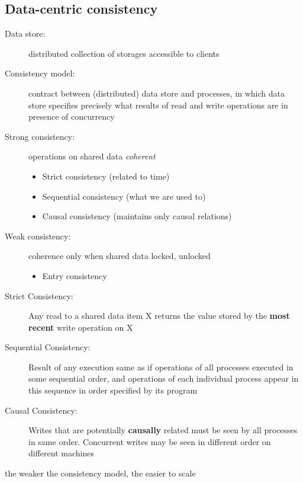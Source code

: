 \subsection{Data-centric consistency}
\begin{description}
	\item[Data store:] distributed collection of storages accessible to clients
	\item[Consistency model:] contract between (distributed) data store and processes, in which data store specifies precisely what results of read and write operations are in presence of concurrency
	\item[Strong consistency:] operations on shared data \textit{coherent}
		\begin{itemize}
			\item Strict consistency (related to time)
			\item Sequential consistency (what we are used to)
			\item Causal consistency (maintains only causal relations)	
		\end{itemize}
	\item[Weak consistency:] coherence only when shared data locked, unlocked
		\begin{itemize}
			\item Entry consistency	
		\end{itemize}
	\item[Strict Consistency:] Any read to a shared data item X returns the value stored by the \textbf{most recent} write operation on X
	\item[Sequential Consistency:] Result of any execution same as if operations of all processes executed in some sequential order, and operations of each individual process appear in this sequence in order specified by its program
	\item[Causal Consistency:] Writes that are potentially \textbf{causally} related must be seen by all processes in same order. Concurrent writes may be seen in different order on different machines
\end{description}
\begin{leftbar}
	the weaker the consistency model, the easier to scale	
\end{leftbar}

